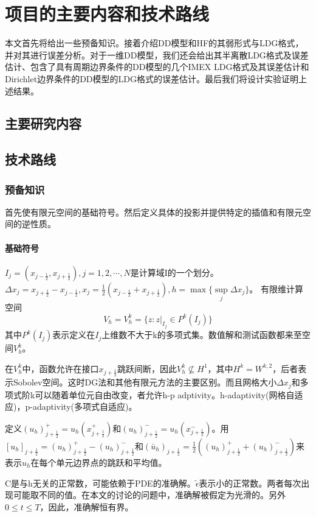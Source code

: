 \section{项目的主要内容和技术路线}
本文首先将给出一些预备知识。接着介绍DD模型和HF的其弱形式与LDG格式，并对其进行误差分析。对于一维DD模型，我们还会给出其半离散LDG格式及误差估计、包含了具有周期边界条件的DD模型的几个IMEX LDG格式及其误差估计和Dirichlet边界条件的DD模型的LDG格式的误差估计。最后我们将设计实验证明上述结果。
\subsection{主要研究内容}

\subsection{技术路线}
\subsubsection{预备知识}
首先使有限元空间的基础符号。然后定义具体的投影并提供特定的插值和有限元空间的逆性质。
\paragraph{基础符号}
$I_j = (x_{j-\frac{1}{2}},x_{j+\frac{1}{2}}),j=1,2,\cdots,N$是计算域I的一个划分。$\Delta x_j = x_{j+\frac{1}{2}}-x_{j-\frac{1}{2}},x_j = \frac{1}{2}(x_{j-\frac{1}{2}}+x_{j+\frac{1}{2}}), h = \max\{\sup\limits_{j} \Delta x_j\}$。
有限维计算空间
\begin{equation*}
    V_h = V_h^k = \{z:z|_{I_j} \in P^k(I_j)\}
\end{equation*}
其中$P^k(I_j)$表示定义在$I_j$上维数不大于k的多项式集。数值解和测试函数都来至空间$V_h^k$。

在$V_h^k$中，函数允许在接口$x_{j+\frac{1}{2}}$跳跃间断，因此$V_h^k \not\subseteq H^1$，其中$H^k = W^{k,2}$，后者表示Sobolev空间。这时DG法和其他有限元方法的主要区别。而且网格大小$\Delta x_j$和多项式阶k可以随着单位元自由改变，者允许h-p adptivity。h-adaptivity(网格自适应)，p-adaptivity(多项式自适应)。

定义$(u_h)^+_{j+\frac{1}{2}} = u_h(x^+_{j+\frac{1}{2}})$和$(u_h)^-_{j+\frac{1}{2}} = u_h(x^-_{j+\frac{1}{2}})$。用$[u_h]_{j+\frac{1}{2}} = (u_h)^+_{j+\frac{1}{2}} - (u_h)^-_{j+\frac{1}{2}}$和$(\bar{u}_h)_{j+\frac{1}{2}}=\frac{1}{2}((u_h)^+_{j+\frac{1}{2}}+(u_h)^-_{j+\frac{1}{2}})$来表示$u_h$在每个单元边界点的跳跃和平均值。

C是与h无关的正常数，可能依赖于PDE的准确解。$\tilde{\epsilon}$表示小的正常数。两者每次出现可能取不同的值。在本文的讨论的问题中，准确解被假定为光滑的。另外$0\leq t \leq T$，因此，准确解恒有界。
